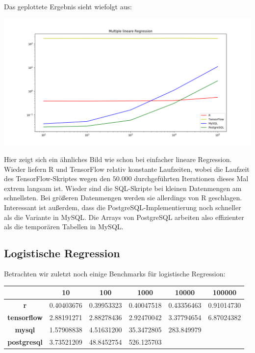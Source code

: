Das geplottete Ergebnis sieht wiefolgt aus:

\includegraphics[width=\textwidth]{multipleLinearRegressionBenchmark}

Hier zeigt sich ein ähnliches Bild wie schon bei einfacher lineare Regression. Wieder liefern R und TensorFlow relativ konstante Laufzeiten, wobei die Laufzeit des TensorFlow-Skriptes wegen den $50.000$ durchgeführten Iterationen dieses Mal extrem langsam ist. Wieder sind die SQL-Skripte bei kleinen Datenmengen am schnellsten. Bei größeren Datenmengen werden sie allerdings von R geschlagen. Interessant ist außerdem, dass die PostgreSQL-Implementierung noch schneller als die Variante in MySQL. Die Arrays von PostgreSQL arbeiten also effizienter als die temporären Tabellen in MySQL.

\subsection{Logistische Regression}
\label{subsection:4:2:3}

Betrachten wir zuletzt noch einige Benchmarks für logistische Regression:

\begin{center}
  \begin{tabular}{|c|c|c|c|c|c|}\hline
    & \textbf{10} & \textbf{100} & \textbf{1000} & \textbf{10000} & \textbf{100000} \\ \hline
    \textbf{r} & 0.40403676 & 0.39953323 & 0.40047518 & 0.43356463 & 0.91014730 \\ \hline
    \textbf{tensorflow} & 2.88191271 & 2.88278436 & 2.92470042 & 3.37794654 & 6.87024382 \\ \hline
    \textbf{mysql} & 1.57908838 & 4.51631200 & 35.3472805 & 283.849979 & \\ \hline
    \textbf{postgresql} & 3.73521209 & 48.8452754 & 526.125703 & & \\ \hline
  \end{tabular}
\end{center}

